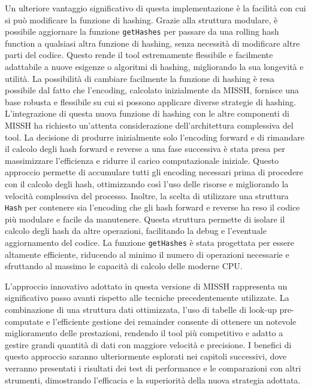 Un ulteriore vantaggio significativo di questa implementazione è la facilità con cui si può modificare la funzione di hashing. Grazie alla struttura modulare, è possibile aggiornare la funzione \verb|getHashes| per passare da una rolling hash function a qualsiasi altra funzione di hashing, senza necessità di modificare altre parti del codice. Questo rende il tool estremamente flessibile e facilmente adattabile a nuove esigenze o algoritmi di hashing, migliorando la sua longevità e utilità. La possibilità di cambiare facilmente la funzione di hashing è resa possibile dal fatto che l'encoding, calcolato inizialmente da \acs{MISSH}, fornisce una base robusta e flessibile su cui si possono applicare diverse strategie di hashing. L'integrazione di questa nuova funzione di hashing con le altre componenti di MISSH ha richiesto un'attenta considerazione dell'architettura complessiva del tool. La decisione di produrre inizialmente solo l'encoding forward e di rimandare il calcolo degli hash forward e reverse a una fase successiva è stata presa per massimizzare l'efficienza e ridurre il carico computazionale iniziale. Questo approccio permette di accumulare tutti gli encoding necessari prima di procedere con il calcolo degli hash, ottimizzando così l'uso delle risorse e migliorando la velocità complessiva del processo. Inoltre, la scelta di utilizzare una struttura \verb|Hash| per contenere sia l'encoding che gli hash forward e reverse ha reso il codice più modulare e facile da manutenere. Questa struttura permette di isolare il calcolo degli hash da altre operazioni, facilitando la debug e l'eventuale aggiornamento del codice. La funzione \verb|getHashes| è stata progettata per essere altamente efficiente, riducendo al minimo il numero di operazioni necessarie e sfruttando al massimo le capacità di calcolo delle moderne CPU.

L'approccio innovativo adottato in questa versione di MISSH rappresenta un significativo passo avanti rispetto alle tecniche precedentemente utilizzate. La combinazione di una struttura dati ottimizzata, l'uso di tabelle di look-up pre-computate e l'efficiente gestione dei remainder consente di ottenere un notevole miglioramento delle prestazioni, rendendo il tool più competitivo e adatto a gestire grandi quantità di dati con maggiore velocità e precisione. I benefici di questo approccio saranno ulteriormente esplorati nei capitoli successivi, dove verranno presentati i risultati dei test di performance e le comparazioni con altri strumenti, dimostrando l'efficacia e la superiorità della nuova strategia adottata.
